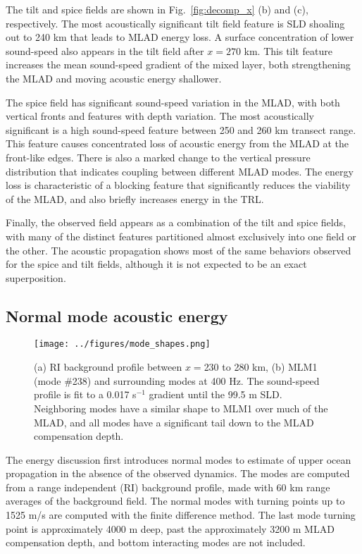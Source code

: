 \documentclass[preprint,NumberedRefs]{JASA}
\begin{document}
The tilt and spice fields are shown in Fig.~\ref{fig:decomp_x} (b) and (c), respectively. The most acoustically significant tilt field feature is SLD shoaling out to 240 km that leads to MLAD energy loss. A surface concentration of lower sound-speed also appears in the tilt field after $x=270$ km. This tilt feature increases the mean sound-speed gradient of the mixed layer, both strengthening the MLAD and moving acoustic energy shallower.

The spice field has significant sound-speed variation in the MLAD, with both vertical fronts and features with depth variation. The most acoustically significant is a high sound-speed feature between 250 and 260 km transect range. This feature causes concentrated loss of acoustic energy from the MLAD at the front-like edges. There is also a marked change to the vertical pressure distribution that indicates coupling between different MLAD modes. The energy loss is characteristic of a blocking feature\cite{colosi2020observations} that significantly reduces the viability of the MLAD, and also briefly increases energy in the TRL.

Finally, the observed field appears as a combination of the tilt and spice fields, with many of the distinct features partitioned almost exclusively into one field or the other. The acoustic propagation shows most of the same behaviors observed for the spice and tilt fields, although it is not expected to be an exact superposition.

\subsection{Normal mode acoustic energy}
\begin{figure}
\texttt{[image: ../figures/mode\_shapes.png]}
    \caption{\label{fig:bg_modes}{(a) RI background profile between $x=$230 to 280 km, (b) MLM1 (mode \#238) and surrounding modes at 400 Hz. The sound-speed profile is fit to a 0.017 s$^{-1}$ gradient until the 99.5 m SLD. Neighboring modes have a similar shape to MLM1 over much of the MLAD, and all modes have a significant tail down to the MLAD compensation depth.}}
\end{figure}

The energy discussion first introduces normal modes to estimate of upper ocean propagation in the absence of the observed dynamics. The modes are computed from a range independent (RI) background profile, made with 60 km range averages of the background field. The normal modes with turning points up to 1525 m/s are computed with the finite difference method.\cite{jensen2011computational} The last mode turning point is approximately 4000 m deep, past the approximately 3200 m MLAD compensation depth, and bottom interacting modes are not included.
\end{document}

